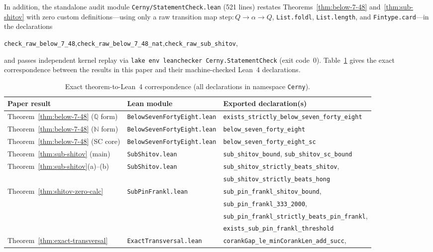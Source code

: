 \documentclass[11pt]{article}
\theoremstyle{definition}
\theoremstyle{remark}
\newcommand{\Q}{\mathbb{Q}}
\newcommand{\N}{\mathbb{N}}
\begin{document}
In addition, the standalone audit module \texttt{Cerny/StatementCheck.lean} (521 lines) restates Theorems~\ref{thm:below-7-48} and~\ref{thm:sub-shitov} with zero custom definitions---using only a raw transition map $\mathrm{step} : Q \to \alpha \to Q$, \texttt{List.foldl}, \texttt{List.length}, and \texttt{Fintype.card}---in the declarations
\begin{center}
  \small\texttt{check\_raw\_below\_7\_48},\quad \texttt{check\_raw\_below\_7\_48\_nat},\quad \texttt{check\_raw\_sub\_shitov},
\end{center}
and passes independent kernel replay via \texttt{lake env leanchecker Cerny.StatementCheck} (exit code~0). Table~\ref{tab:lean-map} gives the exact correspondence between the results in this paper and their machine-checked Lean~4 declarations.

\begin{table}[ht]
\centering
\caption{Exact theorem-to-Lean~4 correspondence (all declarations in namespace \texttt{Cerny}).}
\label{tab:lean-map}
\footnotesize
\begin{tabular}{@{}lll@{}}
\toprule
Paper result & Lean module & Exported declaration(s) \\
\midrule
Theorem~\ref{thm:below-7-48} ($\Q$ form) & \texttt{BelowSevenFortyEight.lean} & \texttt{exists\_strictly\_below\_seven\_forty\_eight} \\
Theorem~\ref{thm:below-7-48} ($\N$ form) & \texttt{BelowSevenFortyEight.lean} & \texttt{below\_seven\_forty\_eight} \\
Theorem~\ref{thm:below-7-48} (SC core) & \texttt{BelowSevenFortyEight.lean} & \texttt{below\_seven\_forty\_eight\_sc} \\
Theorem~\ref{thm:sub-shitov} (main) & \texttt{SubShitov.lean} & \texttt{sub\_shitov\_bound}, \texttt{sub\_shitov\_sc\_bound} \\
Theorem~\ref{thm:sub-shitov}(a)--(b) & \texttt{SubShitov.lean} & \texttt{sub\_shitov\_strictly\_beats\_shitov}, \\
 & & \texttt{sub\_shitov\_strictly\_beats\_hong} \\
Theorem~\ref{thm:shitov-zero-calc} & \texttt{SubPinFrankl.lean} & \texttt{sub\_pin\_frankl\_shitov\_bound}, \\
 & & \texttt{sub\_pin\_frankl\_333\_2000}, \\
 & & \texttt{sub\_pin\_frankl\_strictly\_beats\_pin\_frankl}, \\
 & & \texttt{exists\_sub\_pin\_frankl\_threshold} \\
Theorem~\ref{thm:exact-transversal} & \texttt{ExactTransversal.lean} & \texttt{corankGap\_le\_minCorankLen\_add\_succ}, \\

\end{tabular}
\end{table}
\end{document}
